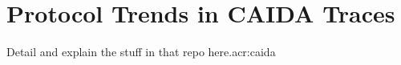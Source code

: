 \chapter{Protocol Trends in CAIDA Traces}
\label{adx:caida-traffic}

Detail and explain the stuff in that repo here.\gls{acr:caida}~\parencite{caida-2018-passive}
